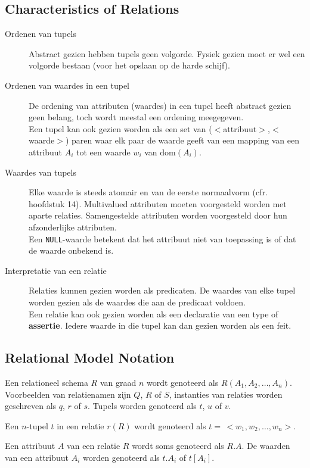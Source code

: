 \subsection{Characteristics of Relations}
\begin{description}
	\item[Ordenen van tupels] Abstract gezien hebben tupels geen volgorde. Fysiek gezien moet er wel een volgorde bestaan (voor het opslaan op de harde schijf).
	\item[Ordenen van waardes in een tupel] De ordening van attributen (waardes) in een tupel heeft abstract gezien geen belang, toch wordt meestal een ordening meegegeven.\\
	Een tupel kan ook gezien worden als een set van ($<$attribuut$>$,$<$waarde$>$) paren waar elk paar de waarde geeft van een mapping van een attribuut $A_i$ tot een waarde $w_i$ van $\text{dom}(A_i)$.
	\item[Waardes van tupels] Elke waarde is steeds atomair en van de eerste normaalvorm (cfr. hoofdstuk 14). Multivalued attributen moeten voorgesteld worden met aparte relaties. Samengestelde attributen worden voorgesteld door hun afzonderlijke attributen.\\
	Een \texttt{NULL}-waarde betekent dat het attribuut niet van toepassing is of dat de waarde onbekend is.
	\item[Interpretatie van een relatie] Relaties kunnen gezien worden als predicaten. De waardes van elke tupel worden gezien als de waardes die aan de predicaat voldoen.\\
Een relatie kan ook gezien worden als een declaratie van een type of \textbf{assertie}. Iedere waarde in die tupel kan dan gezien worden als een feit.
\end{description}

\subsection{Relational Model Notation}
Een relationeel schema $R$ van graad $n$ wordt genoteerd als $R(A_1, A_2, \dots, A_n)$. Voorbeelden van relatienamen zijn $Q$, $R$ of $S$, instanties van relaties worden geschreven als $q$, $r$ of $s$. Tupels worden genoteerd als $t$, $u$ of $v$.

Een $n$-tupel $t$ in een relatie $r(R)$ wordt genoteerd als $t =\, <w_1, w_2, \dots, w_n>$.

Een attribuut $A$ van een relatie $R$ wordt soms genoteerd als $R.A$. De waarden van een attribuut $A_i$ worden genoteerd als $t.A_i$ of $t[A_i]$.

